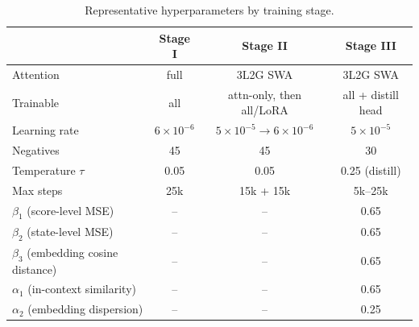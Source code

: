 \documentclass{article}
\begin{document}
\begin{table}[h]
\centering
\small
\caption{Representative hyperparameters by training stage.}
\begin{tabular}{lccc}
\toprule
 & Stage I & Stage II & Stage III \\
\midrule
Attention & full & 3L2G SWA & 3L2G SWA \\
Trainable & all & attn-only, then all/LoRA & all + distill head \\
Learning rate & $6\times10^{-6}$ & $5\times10^{-5}\rightarrow 6\times10^{-6}$ & $5\times10^{-5}$ \\
Negatives & 45 & 45 & 30 \\
Temperature $\tau$ & 0.05 & 0.05 & 0.25 (distill) \\
Max steps & 25k & 15k + 15k & 5k--25k \\
$\beta_{1}$ (score-level MSE) & -- & -- & 0.65 \\
$\beta_{2}$ (state-level MSE) & -- & -- & 0.65 \\
$\beta_{3}$ (embedding cosine distance) & -- & -- & 0.65 \\
$\alpha_{1}$ (in-context similarity) & -- & -- & 0.65 \\
$\alpha_{2}$ (embedding dispersion) & -- & -- & 0.25 \\
\bottomrule
\end{tabular}
\end{table}
\end{document}
